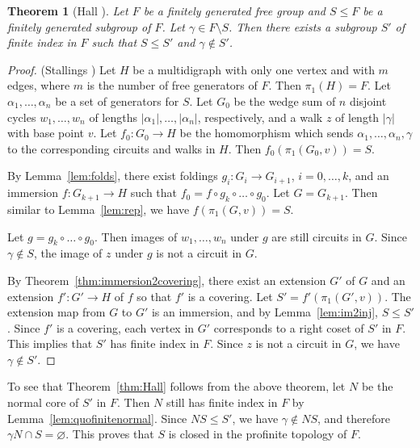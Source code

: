 \documentclass[10pt,a4paper]{amsart}
\newtheorem{theorem}{Theorem}[section]
\theoremstyle{definition}
\theoremstyle{definition}
\numberwithin{equation}{section}
\begin{document}
\begin{theorem}[Hall \cite{Ha49}]\label{thm:Hall2} Let $F$ be a finitely generated free group and $S\leq F$ be a finitely generated subgroup of $F$. Let $\gamma\in F\setminus S$. Then there exists a subgroup $S'$ of finite index in $F$ such that $S\leq S'$ and $\gamma\not\in S'$.
\end{theorem}

\begin{proof} (Stallings \cite{St83}) Let $H$ be a multidigraph with only one vertex and with $m$ edges, where $m$ is the number of  free generators of $F$. Then $\pi_1(H)=F$. Let $\alpha_1,\dots, \alpha_n$ be a set of generators for $S$. Let $G_0$ be the wedge sum of $n$ disjoint cycles $w_1, \dots, w_n$ of lengths $|\alpha_1|, \dots, |\alpha_n|$, respectively, and a walk $z$ of length $|\gamma|$ with base point $v$. Let $f_0\colon G_0\to H$ be the homomorphism which sends $\alpha_1, \dots, \alpha_n, \gamma$ to the corresponding circuits and walks in $H$. Then $f_0(\pi_1(G_0, v))=S$.

By Lemma~\ref{lem:folds}, there exist foldings $g_i\colon G_i\to G_{i+1}$, $i=0,\dots, k$, and an immersion $f\colon G_{k+1}\to H$ such that $f_0=f\circ g_k\circ \dots\circ g_0$. Let $G=G_{k+1}$. Then similar to Lemma~\ref{lem:rep}, we have $f(\pi_1(G, v))=S$. 

Let $g=g_k\circ \dots\circ g_0$. Then images of $w_1, \dots, w_n$ under $g$ are still circuits in $G$. Since $\gamma\not\in S$, the image of $z$ under $g$ is not a circuit in $G$. 

By Theorem~\ref{thm:immersion2covering}, there exist an extension $G'$ of $G$ and an extension $f'\colon G'\to H$ of $f$ so that $f'$ is a covering. Let $S'=f'(\pi_1(G',v))$. The extension map from $G$ to $G'$ is an immersion, and by Lemma~\ref{lem:im2inj}, $S\leq S'$. Since $f'$ is a covering, each vertex in $G'$ corresponds to a right coset of $S'$ in $F$. This implies that $S'$ has finite index in $F$. Since $z$ is not a circuit in $G$, we have $\gamma\not\in S'$. 
\end{proof}

To see that Theorem~\ref{thm:Hall} follows from the above theorem, let $N$ be the normal core of $S'$ in $F$. Then $N$ still has finite index in $F$ by Lemma~\ref{lem:quofinitenormal}. Since $NS\leq S'$, we have $\gamma\not\in NS$, and therefore $\gamma N\cap S=\varnothing$. This proves that $S$ is closed in the profinite topology of $F$. 
\end{document}
